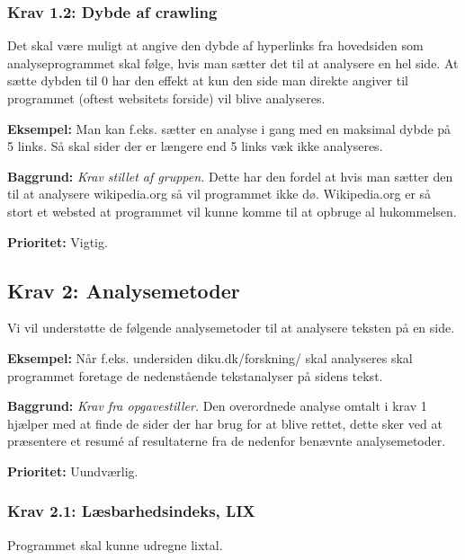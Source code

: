 \documentclass[a4paper,oneside,article, titlepage]{article}
\begin{document}
\subsubsection{Krav 1.2: Dybde af crawling}
Det skal være muligt at angive den dybde af hyperlinks fra hovedsiden
som analyseprogrammet skal følge, hvis man sætter det til at analysere
en hel side. At sætte dybden til 0 har den effekt at kun den side man
direkte angiver til programmet (oftest websitets forside) vil blive
analyseres.

\begin{description}
\item \textbf{Eksempel:} Man kan f.eks. sætter en analyse i gang med
  en maksimal dybde på 5 links. Så skal sider der er længere end 5
  links væk ikke analyseres.

\item \textbf{Baggrund:} \textit{Krav stillet af gruppen.} Dette har
  den fordel at hvis man sætter den til at analysere wikipedia.org så
  vil programmet ikke dø. Wikipedia.org er så stort et websted at
  programmet vil kunne komme til at opbruge al hukommelsen.
\item \textbf{Prioritet:} Vigtig.
\end{description}

\subsection{Krav 2: Analysemetoder}
Vi vil understøtte de følgende analysemetoder til at analysere teksten
på en side.

\begin{description}
\item \textbf{Eksempel:} Når f.eks. undersiden diku.dk/forskning/ skal
  analyseres skal programmet foretage de nedenstående tekstanalyser på
  sidens tekst.

\item \textbf{Baggrund:} \textit{Krav fra opgavestiller.} Den
  overordnede analyse omtalt i krav 1 hjælper med at finde de sider
  der har brug for at blive rettet, dette sker ved at præsentere et
  resumé af resultaterne fra de nedenfor benævnte analysemetoder.
\item \textbf{Prioritet:} Uundværlig.
\end{description}

\subsubsection{Krav 2.1: Læsbarhedsindeks, LIX}
Programmet skal kunne udregne lixtal.
\end{document}
